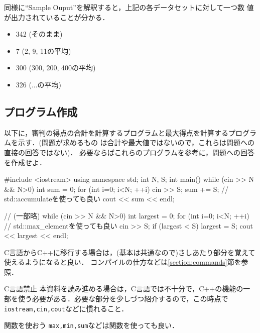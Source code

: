 同様に``Sample Ouput''を解釈すると，上記の各データセットに対して一つ数
値が出力されていることが分かる．
\begin{itemize}
\item 342 (そのまま)
\item 7 (2, 9, 11の平均)
\item 300 (300, 200, 400の平均)
\item 326 (...の平均)
\end{itemize}

\subsection{プログラム作成}

以下に，審判の得点の合計を計算するプログラムと最大得点を計算するプログラムを示す．(問題が求めるもの
は合計や最大値ではないので，これらは問題への直接の回答ではない)．
必要ならばこれらのプログラムを参考に，問題への回答を作成せよ．

\begin{cbox}[emphstyle={[2]\graytext},emph={[2]iostream,using,namespace,std,cin,cout,endl}]
#include <iostream>
using namespace std;
int N, S;
int main() {
    while (cin >> N && N>0) {
        int sum = 0;
        for (int i=0; i<N; ++i) {
            cin >> S;
            sum += S; // std::accumulateを使っても良い
        }
        cout << sum << endl;
    }
}
\end{cbox}

\begin{cbox}[emphstyle={[2]\graytext},emph={[2]iostream,using,namespace,std,cin,cout,endl}]
// (一部略)
    while (cin >> N && N>0) {
        int largest = 0;
        for (int i=0; i<N; ++i) { // std::max\_elementを使っても良い
            cin >> S;
            if (largest < S) largest = S;
        }
        cout << largest << endl;
    }
\end{cbox}
C言語からC++に移行する場合は，(基本は共通なので)さしあたり部分を覚えて使えるようになると良い．
コンパイルの仕方などは\ref{section:commands}節を参照．

\begin{warningbox}{C言語禁止}
  本資料を読み進める場合は，C言語では不十分で，C++の機能の一部を使う必要がある．必要な部分を少しづつ紹介するので，この時点で\texttt{iostream,cin,cout}などに慣れること．
\end{warningbox}

\begin{tipsbox}{関数を使おう}
  \texttt{max,min,sum}などは関数を使っても良い．
\end{tipsbox}

